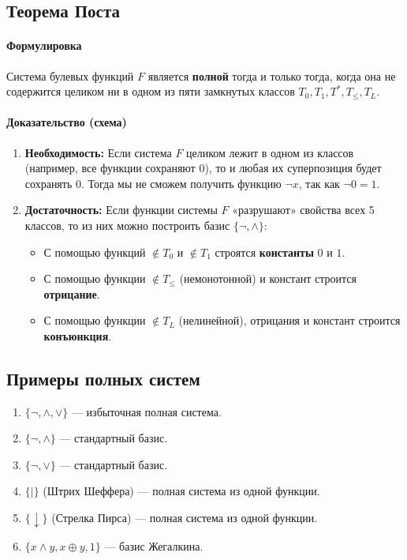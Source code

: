 \subsection*{Теорема Поста}

\paragraph{Формулировка}
Система булевых функций $F$ является \textbf{полной} тогда и только тогда, когда она не содержится целиком ни в одном из пяти замкнутых классов $T_0, T_1, T^*, T_{\le}, T_L$.

\paragraph{Доказательство (схема)}
\begin{enumerate}
    \item \textbf{Необходимость:} Если система $F$ целиком лежит в одном из классов (например, все функции сохраняют 0), то и любая их суперпозиция будет сохранять 0. Тогда мы не сможем получить функцию $\neg x$, так как $\neg 0 = 1$.
    \item \textbf{Достаточность:} Если функции системы $F$ «разрушают» свойства всех 5 классов, то из них можно построить базис $\{\neg, \land\}$:
    \begin{itemize}
        \item С помощью функций $\notin T_0$ и $\notin T_1$ строятся \textbf{константы} $0$ и $1$.
        \item С помощью функции $\notin T_{\le}$ (немонотонной) и констант строится \textbf{отрицание}.
        \item С помощью функции $\notin T_L$ (нелинейной), отрицания и констант строится \textbf{конъюнкция}.
    \end{itemize}
\end{enumerate}

\subsection*{Примеры полных систем}

\begin{enumerate}
    \item $\{\neg, \land, \lor\}$ — избыточная полная система.
    \item $\{\neg, \land\}$ — стандартный базис.
    \item $\{\neg, \lor\}$ — стандартный базис.
    \item $\{| \}$ (Штрих Шеффера) — полная система из одной функции.
    \item $\{\downarrow \}$ (Стрелка Пирса) — полная система из одной функции.
    \item $\{x \land y, x \oplus y, 1\}$ — базис Жегалкина.
\end{enumerate}

